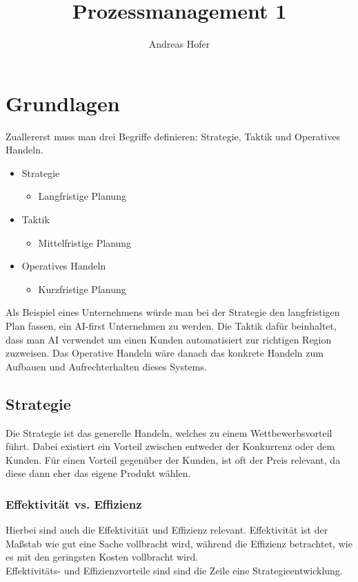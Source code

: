 \documentclass{article}
\title{\vspace{-1cm}Prozessmanagement 1}
\author{Andreas Hofer}
\begin{document}
	\maketitle
	\tableofcontents
	\section{Grundlagen}
  Zuallererst muss man drei Begriffe definieren: Strategie, Taktik und Operatives Handeln.
  \begin{itemize}
    \item{Strategie}
    \begin{itemize}
      \item{Langfristige Planung}
    \end{itemize}
    \item{Taktik}
    \begin{itemize}
      \item{Mittelfristige Planung}
    \end{itemize}
    \item{Operatives Handeln}
    \begin{itemize}
      \item{Kurzfristige Planung}
    \end{itemize}
  \end{itemize}
  Als Beispiel eines Unternehmens würde man bei der Strategie den langfristigen Plan fassen, ein AI-first Unternehmen zu werden. Die Taktik dafür beinhaltet, dass man AI verwendet um einen Kunden automatisiert zur richtigen Region zuzweisen. Das Operative Handeln wäre danach das konkrete Handeln zum Aufbauen und Aufrechterhalten dieses Systems.
  \subsection{Strategie}
  Die Strategie ist das generelle Handeln, welches zu einem Wettbewerbsvorteil führt. Dabei existiert ein Vorteil zwischen entweder der Konkurrenz oder dem Kunden. Für einen Vorteil gegenüber der Kunden, ist oft der Preis relevant, da diese dann eher das eigene Produkt wählen. \\
  \subsubsection{Effektivität vs. Effizienz}
  Hierbei sind auch die Effektivitiät und Effizienz relevant. Effektivität ist der Maßstab wie gut eine Sache vollbracht wird, während die Effizienz betrachtet, wie es mit den geringsten Kosten vollbracht wird. \\
  Effektivitäts- und Effizienzvorteile sind sind die Zeile eine Strategieentwicklung.
\end{document}
